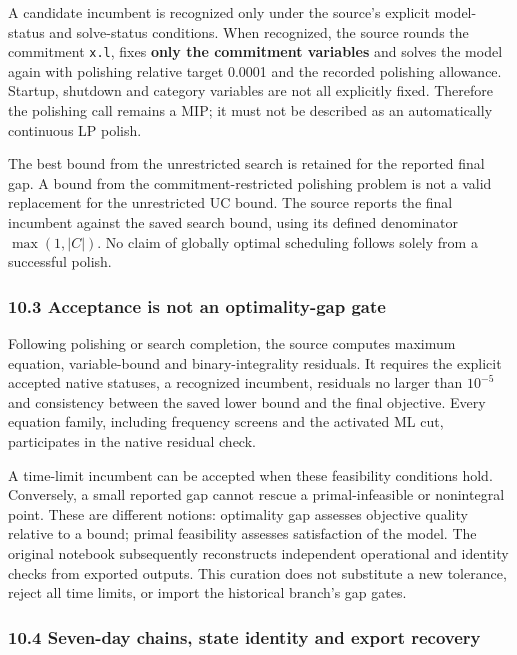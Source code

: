 \documentclass[
  11pt,
  a4paper,
]{article}
\begin{document}
A candidate incumbent is recognized only under the source's explicit
model-status and solve-status conditions. When recognized, the source
rounds the commitment \texttt{x.l}, fixes \textbf{only the commitment
variables} and solves the model again with polishing relative target
0.0001 and the recorded polishing allowance. Startup, shutdown and
category variables are not all explicitly fixed. Therefore the polishing
call remains a MIP; it must not be described as an automatically
continuous LP polish.

The best bound from the unrestricted search is retained for the reported
final gap. A bound from the commitment-restricted polishing problem is
not a valid replacement for the unrestricted UC bound. The source
reports the final incumbent against the saved search bound, using its
defined denominator \(\max(1,|C|)\). No claim of globally optimal
scheduling follows solely from a successful polish.

\subsubsection{10.3 Acceptance is not an optimality-gap
gate}\label{acceptance-is-not-an-optimality-gap-gate}

Following polishing or search completion, the source computes maximum
equation, variable-bound and binary-integrality residuals. It requires
the explicit accepted native statuses, a recognized incumbent, residuals
no larger than \(10^{-5}\) and consistency between the saved lower bound
and the final objective. Every equation family, including frequency
screens and the activated ML cut, participates in the native residual
check.

A time-limit incumbent can be accepted when these feasibility conditions
hold. Conversely, a small reported gap cannot rescue a primal-infeasible
or nonintegral point. These are different notions: optimality gap
assesses objective quality relative to a bound; primal feasibility
assesses satisfaction of the model. The original notebook subsequently
reconstructs independent operational and identity checks from exported
outputs. This curation does not substitute a new tolerance, reject all
time limits, or import the historical branch's gap gates.

\subsubsection{10.4 Seven-day chains, state identity and export
recovery}\label{seven-day-chains-state-identity-and-export-recovery}
\end{document}
